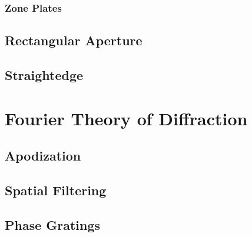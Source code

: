 \documentclass[../electromagnetism.tex]{subfiles}
\begin{document}
\subsubsection{Zone Plates}
\subsection{Rectangular Aperture}
\subsection{Straightedge}
\section{Fourier Theory of Diffraction}
\subsection{Apodization}
\subsection{Spatial Filtering}
\subsection{Phase Gratings}
\end{document}
